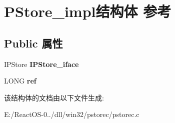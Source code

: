 \hypertarget{struct_p_store__impl}{}\section{P\+Store\+\_\+impl结构体 参考}
\label{struct_p_store__impl}
\subsection*{Public 属性}
\begin{DoxyCompactItemize}
\item 
\mbox{\label{struct_p_store__impl_a5e4033f9fbb712ed256f9c6e49a84049}} 
I\+P\+Store {\bfseries I\+P\+Store\+\_\+iface}
\item 
\mbox{\label{struct_p_store__impl_a58feee2fa8ace390e3c4d4e9038464a8}} 
L\+O\+NG {\bfseries ref}
\end{DoxyCompactItemize}


该结构体的文档由以下文件生成\+:\begin{DoxyCompactItemize}
\item 
E\+:/\+React\+O\+S-\/0../dll/win32/pstorec/pstorec.\+c\end{DoxyCompactItemize}
